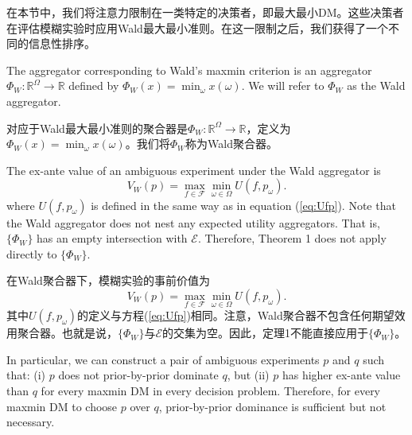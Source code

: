 \documentclass[12pt,a4paper]{article}
\newenvironment{original}
  {\par\vspace{4pt}\noindent\color{black}\ignorespaces}
  {\par\vspace{2pt}}
\newenvironment{translation}
  {\par\vspace{2pt}\noindent\color{myblue}\ignorespaces}
  {\par\vspace{6pt}}
\newcommand{\R}{\mathbb{R}}
\newcommand{\calF}{\mathcal{F}}
\newcommand{\calE}{\mathcal{E}}
\begin{document}
\begin{translation}
在本节中，我们将注意力限制在一类特定的决策者，即最大最小DM。这些决策者在评估模糊实验时应用Wald最大最小准则。在这一限制之后，我们获得了一个不同的信息性排序。
\end{translation}

\begin{original}
The aggregator corresponding to Wald's maxmin criterion is an aggregator $\Phi_W:\R^{\Omega}\to\R$ defined by $\Phi_W(x)=\min_{\omega} x(\omega)$. We will refer to $\Phi_W$ as the Wald aggregator.
\end{original}

\begin{translation}
对应于Wald最大最小准则的聚合器是$\Phi_W:\R^{\Omega}\to\R$，定义为$\Phi_W(x)=\min_{\omega} x(\omega)$。我们将$\Phi_W$称为Wald聚合器。
\end{translation}

\begin{original}
The ex-ante value of an ambiguous experiment under the Wald aggregator is
\begin{equation}
    V_W(p) = \max_{f\in\calF} \min_{\omega\in\Omega} U(f, p_{\omega}). \label{eq:VW}
\end{equation}
where $U(f, p_{\omega})$ is defined in the same way as in equation (\ref{eq:Ufp}). Note that the Wald aggregator does not nest any expected utility aggregators. That is, $\{\Phi_W\}$ has an empty intersection with $\calE$. Therefore, Theorem 1 does not apply directly to $\{\Phi_W\}$.
\end{original}

\begin{translation}
在Wald聚合器下，模糊实验的事前价值为
\begin{equation}
    V_W(p) = \max_{f\in\calF} \min_{\omega\in\Omega} U(f, p_{\omega}). \label{eq:VW}
\end{equation}
其中$U(f, p_{\omega})$的定义与方程(\ref{eq:Ufp})相同。注意，Wald聚合器不包含任何期望效用聚合器。也就是说，$\{\Phi_W\}$与$\calE$的交集为空。因此，定理1不能直接应用于$\{\Phi_W\}$。
\end{translation}

\begin{original}
In particular, we can construct a pair of ambiguous experiments $p$ and $q$ such that: (i) $p$ does not prior-by-prior dominate $q$, but (ii) $p$ has higher ex-ante value than $q$ for every maxmin DM in every decision problem. Therefore, for every maxmin DM to choose $p$ over $q$, prior-by-prior dominance is sufficient but not necessary.
\end{original}
\end{document}
